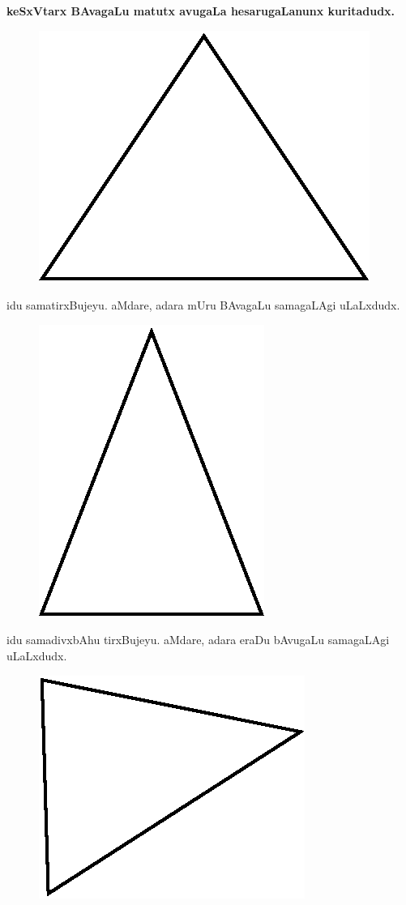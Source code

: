 {\bf keSxVtarx BAvagaLu matutx avugaLa hesarugaLanunx kuritadudx.}
\begin{figure}[H]
\centering
\includegraphics[scale=.75]{figure/fig1.eps}
\end{figure}
idu samatirxBujeyu. aMdare, adara mUru BAvagaLu samagaLAgi uLaLxdudx.
\begin{figure}[H]
\centering
\includegraphics[scale=.75]{figure/fig2.eps}
\end{figure}
idu samadivxbAhu tirxBujeyu. aMdare, adara eraDu bAvugaLu samagaLAgi
uLaLxdudx. 
\begin{figure}[H]
\centering
\includegraphics[scale=.75]{figure/fig3.eps}
\end{figure}
